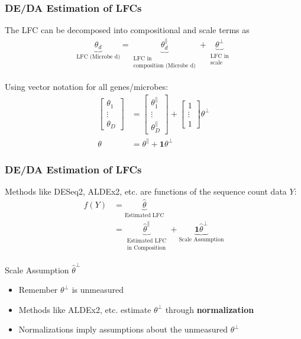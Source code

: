 \documentclass[11pt]{beamer}
\begin{document}
\begin{frame}
  \frametitle{DE/DA Estimation of LFCs}

  The LFC can be decomposed into compositional and scale terms as 
  \begin{align*}
    \underbrace{\theta_d}_{\text{LFC (Microbe d)}} = \underbrace{\theta_d^\parallel}_{\substack{\text{LFC in} \\ \text{composition (Microbe d)}}} + \underbrace{\theta^\perp}_{\substack{\text{LFC in} \\ \text{scale}}}
  \end{align*}

  \pause

  Using vector notation for all genes/microbes:
  \begin{align*}
    \begin{bmatrix} \theta_1 \\ \vdots \\ \theta_D \end{bmatrix} &= \begin{bmatrix} \theta^\parallel_1 \\ \vdots \\ \theta^\parallel_D \end{bmatrix} + \begin{bmatrix} 1 \\ \vdots \\ 1 \end{bmatrix} \theta^\perp \\
    \theta &= \theta^\parallel + \pmb{1}\theta^\perp
  \end{align*}
\end{frame}


\begin{frame}
  \frametitle{DE/DA Estimation of LFCs}

  \pause

  Methods like DESeq2, ALDEx2, etc. are functions of the sequence count data \(Y\):
  \begin{align*}
    f(Y) &= \underbrace{\hat{\theta}}_{\text{Estimated LFC}} \\
         &= \underbrace{\hat{\theta}^\parallel}_{\substack{\text{Estimated LFC} \\ \text{in Composition}}} + \underbrace{\pmb{1}\hat{\theta}^\perp}_{\text{Scale Assumption}}
  \end{align*}

  \pause

  \begin{exampleblock}{Scale Assumption \(\hat{\theta}^\perp\)}
    \begin{itemize}
      \item Remember \(\theta^\perp\) is unmeasured
      \item Methods like ALDEx2, etc. estimate \(\theta^\perp\) through \textbf{normalization}
      \item Normalizations imply assumptions about the unmeasured \(\theta^\perp\)
    \end{itemize}
  \end{exampleblock}
\end{frame}
\end{document}
